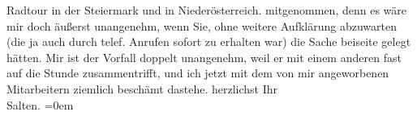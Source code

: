 \begin{ledgroupsized}[t]{13cm}
{{{                     Radtour in der Steiermark und in Niederösterreich.}}}\label{K_L03333-3h} mitgenommen, denn
               es wäre mir doch äußerst unangenehm, wenn Sie, ohne weitere Aufklärung abzuwarten
               (die ja auch durch telef. Anrufen sofort zu erhalten war) die Sache beiseite gelegt
               hätten. Mir ist der Vorfall doppelt unangenehm, weil er mit einem anderen fast auf
               die Stunde zusammentrifft, und ich jetzt mit dem von mir angeworbenen Mitarbeitern
               ziemlich beschämt dastehe.\pend
           \pstart
           herzlichst Ihr {\\[\baselineskip]}\spacefill\mbox{Salten.}\pend
           \leftskip=0em{}
         
         \endnumbering{}\end{ledgroupsized}  \newcommand{\dateiname}{L03333}\newcommand{\titel}{Felix Salten an Arthur Schnitzler, 2. 9. 1902}\newcommand{\editorInnen}{Martin Anton Müller und Laura Untner}
      